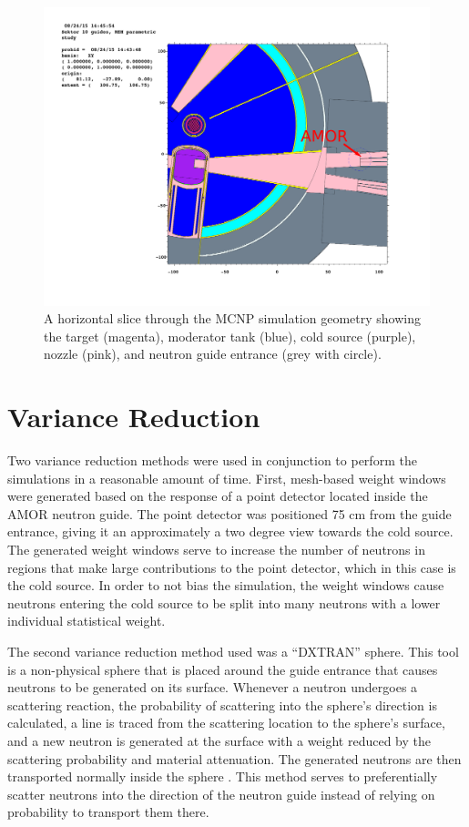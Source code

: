 \documentclass[a4paper]{jpconf}
\begin{document}
\begin{figure}
\begin{center}
\includegraphics[trim={9.2cm 8cm 4cm 8cm},clip]{graphics/geom2.pdf}
\end{center}
\caption{\label{geom}A horizontal slice through the MCNP simulation geometry showing the target (magenta), moderator tank (blue), cold source (purple), nozzle (pink), and neutron guide entrance (grey with circle).}
\end{figure}

\section{Variance Reduction}

Two variance reduction methods were used in conjunction to perform the simulations in a reasonable amount of time.  First, mesh-based weight windows were generated based on the response of a point detector located inside the AMOR neutron guide.  The point detector was positioned 75 cm from the guide entrance, giving it an approximately a two degree view towards the cold source.  The generated weight windows serve to increase the number of neutrons in regions that make large contributions to the point detector, which in this case is the cold source. In order to not bias the simulation, the weight windows cause neutrons entering the cold source to be split into many neutrons with a lower individual statistical weight.  

The second variance reduction method used was a ``DXTRAN'' sphere.  This tool is a non-physical sphere that is placed around the guide entrance that causes neutrons to be generated on its surface.  Whenever a neutron undergoes a scattering reaction, the probability of scattering into the sphere's direction is calculated, a line is traced from the scattering location to the sphere's surface, and a new neutron is generated at the surface with a weight reduced by the scattering probability and material attenuation.  The generated neutrons are then transported normally inside the sphere \cite{mcnp5,mcnp6}.  This method serves to preferentially scatter neutrons into the direction of the neutron guide instead of relying on probability to transport them there.
\end{document}
